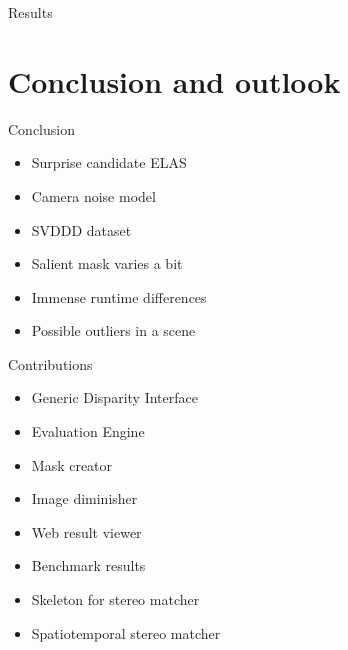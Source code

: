 \documentclass[10pt]{beamer}
\begin{document}
\begin{frame}[fragile]{Results}
  \begin{table}
  \centering
  \caption{Result table for general performance of SVDDD (PBMP$_{noc,1px}$)}
  \end{table}
\end{frame}

\section{Conclusion and outlook}

\begin{frame}[fragile]{Conclusion}
  \begin{itemize}
    \item Surprise candidate ELAS
    \item Camera noise model
    \item SVDDD dataset
    \item Salient mask varies a bit
    \item Immense runtime differences
    \item Possible outliers in a scene
  \end{itemize}
\end{frame}

\begin{frame}[fragile]{Contributions}
  \begin{itemize}
    \item Generic Disparity Interface
    \item Evaluation Engine
    \item Mask creator
    \item Image diminisher
    \item Web result viewer
    \item Benchmark results
    \item Skeleton for stereo matcher
    \item Spatiotemporal stereo matcher
  \end{itemize}
\end{frame}
\end{document}
